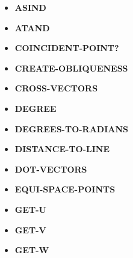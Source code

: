 \documentclass [11pt]{book}
\begin{document}
\begin{itemize}
\item {}
\textbf{ASIND}





\item {}
\textbf{ATAND}





\item {}
\textbf{COINCIDENT-POINT?}





\item {}
\textbf{CREATE-OBLIQUENESS}





\item {}
\textbf{CROSS-VECTORS}





\item {}
\textbf{DEGREE}





\item {}
\textbf{DEGREES-TO-RADIANS}





\item {}
\textbf{DISTANCE-TO-LINE}





\item {}
\textbf{DOT-VECTORS}





\item {}
\textbf{EQUI-SPACE-POINTS}





\item {}
\textbf{GET-U}





\item {}
\textbf{GET-V}





\item {}
\textbf{GET-W}






\end{itemize}
\end{document}
